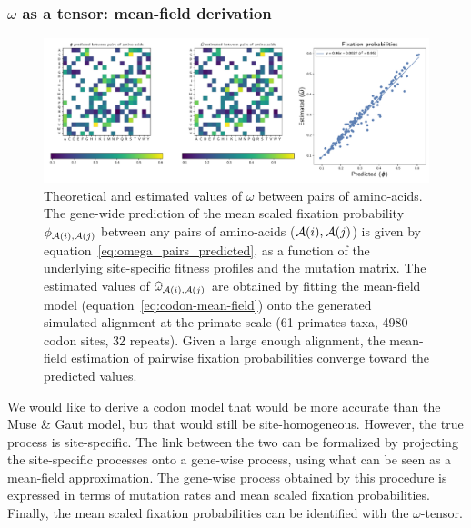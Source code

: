 \documentclass{article}
\begin{document}
\subsubsection{\texorpdfstring{$\omega$}{ω} as a tensor: mean-field derivation}

\begin{figure}[!htb]
 \centering
 \includegraphics[width=\linewidth, page=1]{inference_simulations/omega_MF}
 \caption[Estimation of fixation probability]{
 Theoretical and estimated values of $\omega$ between pairs of amino-acids.
 The gene-wide prediction of the mean scaled fixation probability $\phi_{\mathcal{A}({i}), \mathcal{A}({j})}$ between any pairs of amino-acids ($\mathcal{A}({i}), \mathcal{A}({j})$) is given by equation~\ref{eq:omega_pairs_predicted}, as a function of the underlying site-specific fitness profiles and the mutation matrix.
 The estimated values of $\widehat{\omega}_{\mathcal{A}({i}), \mathcal{A}({j})}$ are obtained by fitting the mean-field model (equation~\ref{eq:codon-mean-field}) onto the generated simulated alignment at the primate scale (61 primates taxa, 4980 codon sites, 32 repeats).
 Given a large enough alignment, the mean-field estimation of pairwise fixation probabilities converge toward the predicted values.
 }
 \label{fig:omega-inference}
\end{figure}

We would like to derive a codon model that would be more accurate than the Muse \& Gaut model, but that would still be site-homogeneous.
However, the true process is site-specific.
The link between the two can be formalized by projecting the site-specific processes onto a gene-wise process, using what can be seen as a mean-field approximation.
The gene-wise process obtained by this procedure is expressed in terms of mutation rates and mean scaled fixation probabilities.
Finally, the mean scaled fixation probabilities can be identified with the $\omega$-tensor.
\end{document}

